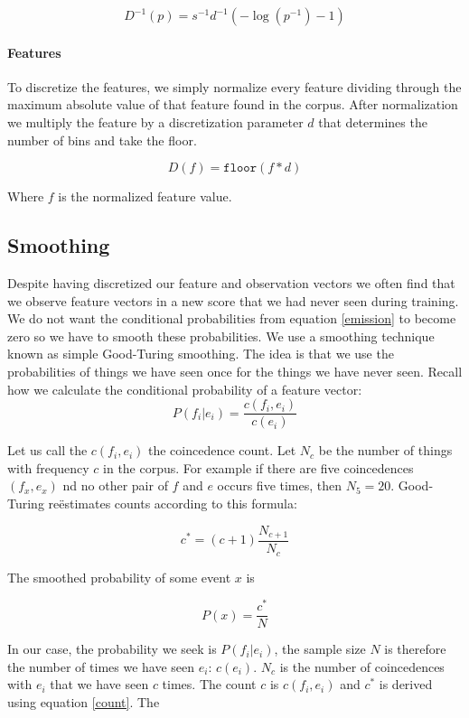\documentclass[a4paper,10pt]{article}
\begin{document}
\begin{equation}
D^{-1}(p) = s^{-1} d^{-1}(-\log(p^{-1}) - 1)
\end{equation}

\paragraph*{Features}

To discretize the features, we simply normalize every feature dividing through the maximum absolute value of that feature found in the corpus. After normalization we multiply the feature by a discretization parameter $d$ that determines the number of bins and take the floor.

\begin{equation}
D(f) = \texttt{floor}(f*d)
\end{equation}

Where $f$ is the normalized feature value.

\subsection{Smoothing}
\label{sec:smoothing}

Despite having discretized our feature and observation vectors we often find that we observe feature vectors in a new score that we had never seen during training. We do not want the conditional probabilities from equation \ref{emission} to become zero so we have to smooth these probabilities. We use a smoothing technique known as simple Good-Turing smoothing. The idea is that we use the probabilities of things we have seen once for the things we have never seen. Recall how we calculate the conditional probability of a feature vector:
\[
P(f_i|e_i) = \frac{c(f_i, e_i)}{c(e_i)}
\]

Let us call the $c(f_i, e_i)$ the coincedence count. Let $N_c$ be the number of things with frequency $c$ in the corpus. For example if there are five coincedences $(f_x, e_x)$ nd no other pair of $f$ and $e$ occurs five times, then $N_{5} = 20$. Good-Turing re\"estimates counts according to this formula:

\begin{equation}
\label{count}
c^* = (c+1) \frac{N_{c+1}}{N_c}
\end{equation}

The smoothed probability of some event $x$ is

\[P(x) = \frac{c^*}{N}\]

In our case, the probability we seek is $P(f_i|e_i)$, the sample size $N$ is therefore the number of times we have seen $e_i$: $c(e_i)$. $N_c$ is the number of coincedences with $e_i$ that we have seen $c$ times. The count $c$ is $c(f_i, e_i)$ and $c^*$ is derived using equation \ref{count}. The 
\end{document}
